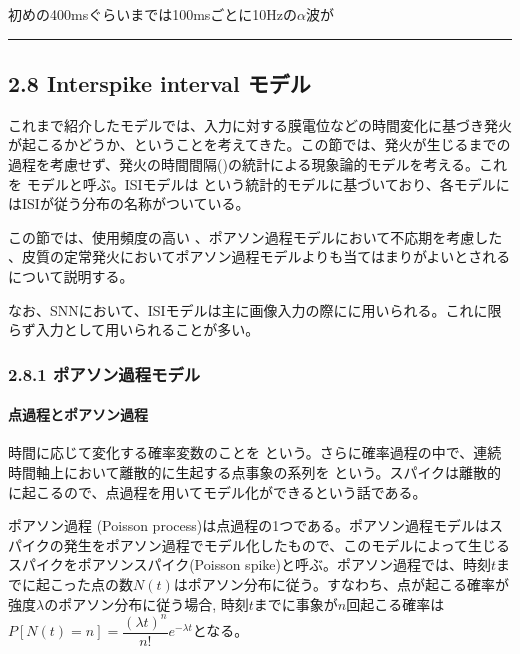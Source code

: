 \documentclass[letterpaper,10pt,english]{sphinxmanual}
\begin{document}
初めの400msぐらいまでは100msごとに10Hzの\(\alpha\)波が


\bigskip\hrule\bigskip



\subsection{2.8 Inter\sphinxhyphen{}spike interval モデル}
\label{\detokenize{2-8_isi:inter-spike-interval}}\label{\detokenize{2-8_isi::doc}}
これまで紹介したモデルでは、入力に対する膜電位などの時間変化に基づき発火が起こるかどうか、ということを考えてきた。この節では、発火が生じるまでの過程を考慮せず、発火の時間間隔()の統計による現象論的モデルを考える。これを モデルと呼ぶ。ISIモデルは という統計的モデルに基づいており、各モデルにはISIが従う分布の名称がついている。

この節では、使用頻度の高い 、ポアソン過程モデルにおいて不応期を考慮した 、皮質の定常発火においてポアソン過程モデルよりも当てはまりがよいとされる について説明する。

なお、SNNにおいて、ISIモデルは主に画像入力の際にに用いられる。これに限らず入力として用いられることが多い。


\subsubsection{2.8.1 ポアソン過程モデル}
\label{\detokenize{2-8_isi:id1}}

\paragraph{点過程とポアソン過程}
\label{\detokenize{2-8_isi:id2}}
時間に応じて変化する確率変数のことを という。さらに確率過程の中で、連続時間軸上において離散的に生起する点事象の系列を という。スパイクは離散的に起こるので、点過程を用いてモデル化ができるという話である。

ポアソン過程 (Poisson process)は点過程の1つである。ポアソン過程モデルはスパイクの発生をポアソン過程でモデル化したもので、このモデルによって生じるスパイクをポアソンスパイク(Poisson spike)と呼ぶ。ポアソン過程では、時刻\(t\)までに起こった点の数\(N(t)\)はポアソン分布に従う。すなわち、点が起こる確率が強度\(\lambda\)のポアソン分布に従う場合, 時刻\(t\)までに事象が\(n\)回起こる確率は\(P[N(t)=n]=\dfrac{(\lambda t)^{n}}{n !} e^{-\lambda t}\)となる。
\end{document}
